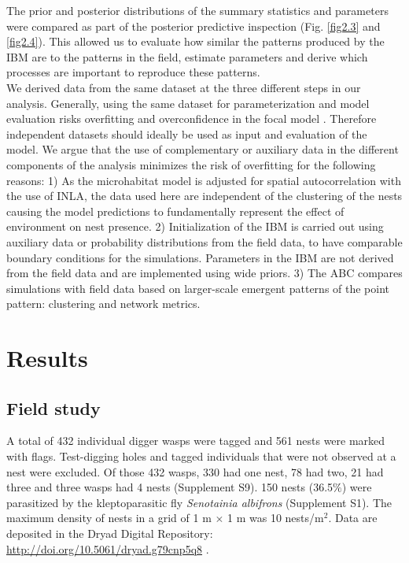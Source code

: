 \documentclass[10pt, twoside]{book} %
\begin{document}
	The prior and posterior distributions of the summary statistics and parameters were compared as part of the posterior predictive inspection (Fig. \ref{fig2.3} and \ref{fig2.4}). This allowed us to evaluate how similar the patterns produced by the IBM are to the patterns in the field, estimate parameters and derive which processes are important to reproduce these patterns.\\
	
	We derived data from the same dataset at the three different steps in our ana\-lysis. Generally, using the same dataset for parameterization and model evaluation risks overfitting and overconfidence in the focal model \citep[termed `adaptive overfitting' in machine learning;][]{roelofs2019}. Therefore independent datasets should ideally be used as input and evaluation of the model. We argue that the use of complementary or auxiliary data in the different components of the analysis minimizes the risk of overfitting for the following reasons: 1) As the microhabitat model is adjusted for spatial autocorrelation with the use of INLA, the data used here are independent of the clustering of the nests causing the model predictions to fundamentally represent the effect of environment on nest presence. 2) Initialization of the IBM is carried out using auxiliary data or probability distributions from the field data, to have comparable boundary conditions for the simulations. Parameters in the IBM are not derived from the field data and are implemented using wide priors. 3) The ABC compares simulations with field data based on larger-scale emergent patterns of the point pattern: clustering and network metrics.\\
	\clearpage
	
	\section{Results}
	\subsection{Field study}
	A total of 432 individual digger wasps were tagged and 561 nests were marked with flags. Test-digging holes \citep{nielsen1945} and tagged individuals that were not observed at a nest were excluded. Of those 432 wasps, 330 had one nest, 78 had two, 21 had three and three wasps had 4 nests (Supplement S9). 150 nests (36.5$\%$) were parasitized by the kleptoparasitic fly \textit{Senotainia albifrons} (Supplement S1). The maximum density of nests in a grid of 1 m $\times$ 1 m was 10 nests/m$^2$. Data are deposited in the Dryad Digital Repository: \url{http://doi.org/10.5061/dryad.g79cnp5q8} \citep{batsleer2021}.
	
\end{document}
